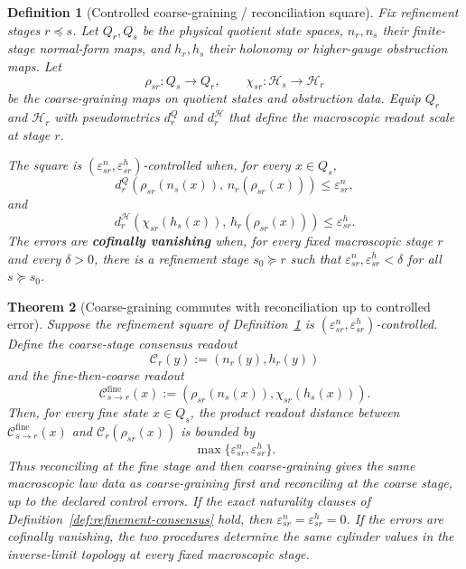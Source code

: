 \documentclass[11pt]{article}
\newtheorem{theorem}{Theorem}[section]
\newtheorem{definition}[theorem]{Definition}
\theoremstyle{remark}
\theoremstyle{plain}
\begin{document}
\begin{definition}[Controlled coarse-graining / reconciliation square]\label{def:controlled-coarse-consensus}
Fix refinement stages \(r\preceq s\). Let \(Q_r,Q_s\) be the physical quotient state spaces,
\(n_r,n_s\) their finite-stage normal-form maps, and \(h_r,h_s\) their holonomy or
higher-gauge obstruction maps. Let
\[
\rho_{sr}:Q_s\to Q_r,
\qquad
\chi_{sr}:\mathcal H_s\to\mathcal H_r
\]
be the coarse-graining maps on quotient states and obstruction data. Equip \(Q_r\) and
\(\mathcal H_r\) with pseudometrics \(d^Q_r\) and \(d^{\mathcal H}_r\) that define the
macroscopic readout scale at stage \(r\).

The square is \((\varepsilon^n_{sr},\varepsilon^h_{sr})\)-controlled when, for every
\(x\in Q_s\),
\[
d^Q_r\!\left(\rho_{sr}(n_s(x)),\,n_r(\rho_{sr}(x))\right)
\le \varepsilon^n_{sr},
\]
and
\[
d^{\mathcal H}_r\!\left(\chi_{sr}(h_s(x)),\,h_r(\rho_{sr}(x))\right)
\le \varepsilon^h_{sr}.
\]
The errors are \textbf{cofinally vanishing} when, for every fixed macroscopic stage \(r\) and
every \(\delta>0\), there is a refinement stage \(s_0\succeq r\) such that
\(\varepsilon^n_{sr},\varepsilon^h_{sr}<\delta\) for all \(s\succeq s_0\).
\end{definition}

\begin{theorem}[Coarse-graining commutes with reconciliation up to controlled error]\label{thm:coarse-grain-consensus}
Suppose the refinement square of Definition~\ref{def:controlled-coarse-consensus} is
\((\varepsilon^n_{sr},\varepsilon^h_{sr})\)-controlled. Define the coarse-stage consensus readout
\[
\mathcal C_r(y):=(n_r(y),h_r(y))
\]
and the fine-then-coarse readout
\[
\mathcal C_{s\to r}^{\mathrm{fine}}(x):=(\rho_{sr}(n_s(x)),\chi_{sr}(h_s(x))).
\]
Then, for every fine state \(x\in Q_s\), the product readout distance between
\(\mathcal C_{s\to r}^{\mathrm{fine}}(x)\) and \(\mathcal C_r(\rho_{sr}(x))\) is bounded by
\[
\max\{\varepsilon^n_{sr},\varepsilon^h_{sr}\}.
\]
Thus reconciling at the fine stage and then coarse-graining gives the same macroscopic law data
as coarse-graining first and reconciling at the coarse stage, up to the declared control errors.
If the exact naturality clauses of Definition~\ref{def:refinement-consensus} hold, then
\(\varepsilon^n_{sr}=\varepsilon^h_{sr}=0\). If the errors are cofinally vanishing, the two
procedures determine the same cylinder values in the inverse-limit topology at every fixed
macroscopic stage.
\end{theorem}
\end{document}
